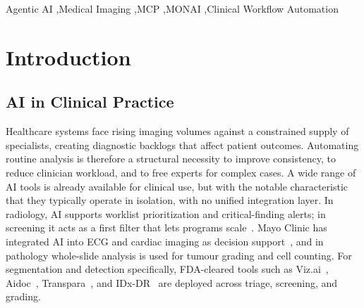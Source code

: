\documentclass[1p,12pt]{elsarticle}
\begin{document}
\begin{frontmatter}
\begin{keyword}
Agentic AI \sep Medical Imaging \sep MCP \sep MONAI \sep Clinical Workflow Automation
\end{keyword}

\end{frontmatter}

\section{Introduction}
\label{sec:introduction}



\subsection{AI in Clinical Practice}
Healthcare systems face rising imaging volumes against a constrained supply of specialists, creating diagnostic backlogs that affect patient outcomes. Automating routine analysis is therefore a structural necessity to improve consistency, to reduce clinician workload, and to free experts for complex cases. A wide range of AI tools is already available for clinical use, but with the notable characteristic that they typically operate in isolation, with no unified integration layer. In radiology, AI supports worklist prioritization and critical-finding alerts; in screening it acts as a first filter that lets programs scale~\cite{ruamviboonsuk2022retinopathy, wolf2024access}. Mayo Clinic has integrated AI into ECG and cardiac imaging as decision support~\cite{mayoclinic-ai-cardiology}, and in pathology whole-slide analysis is used for tumour grading and cell counting. For segmentation and detection specifically, FDA-cleared tools such as Viz.ai~\cite{vizai}, Aidoc~\cite{aidoc}, Transpara~\cite{transpara}, and IDx-DR~\cite{idxdr} are deployed across triage, screening, and grading.
\end{document}
